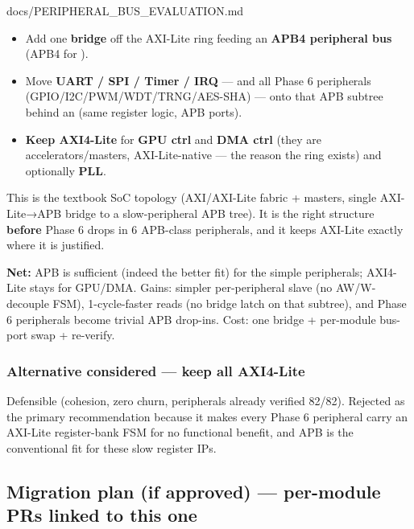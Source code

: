 \begin{relocated}{docs/PERIPHERAL_BUS_EVALUATION.md}
\begin{itemize}
\tightlist
\item
  Add one \textbf{ bridge} off the AXI-Lite ring
  feeding an \textbf{APB4 peripheral bus} (APB4 for ).
\item
  Move \textbf{UART / SPI / Timer / IRQ} --- and all Phase 6 peripherals
  (GPIO/\allowbreak{}I2C/\allowbreak{}PWM/\allowbreak{}WDT/\allowbreak{}TRNG/\allowbreak{}AES-SHA)
  --- onto that APB subtree behind an  (same
  register logic, APB ports).
\item
  \textbf{Keep AXI4-Lite} for \textbf{GPU ctrl} and \textbf{DMA ctrl}
  (they are accelerators/\allowbreak{}masters, AXI-Lite-native --- the
  reason the ring exists) and optionally \textbf{PLL}.
\end{itemize}

This is the textbook SoC topology (AXI/\allowbreak{}AXI-Lite fabric +
masters, single AXI-Lite→APB bridge to a slow-peripheral APB tree). It
is the right structure \textbf{before} Phase 6 drops in 6 APB-class
peripherals, and it keeps AXI-Lite exactly where it is justified.

\textbf{Net:} APB is sufficient (indeed the better fit) for the simple
peripherals; AXI4-Lite stays for GPU/DMA. Gains: simpler per-peripheral
slave (no AW/\allowbreak{}W-decouple FSM), 1-cycle-faster reads (no
bridge latch on that subtree), and Phase 6 peripherals become trivial
APB drop-ins. Cost: one bridge + per-module bus-port swap + re-verify.

\subsubsection{Alternative considered --- keep all AXI4-Lite}\label{tm:dec:peripheral-bus:alternative-considered-keep-all-axi4-lite}

Defensible (cohesion, zero churn, peripherals already verified
 82/82). Rejected as the primary recommendation because it
makes every Phase 6 peripheral carry an AXI-Lite register-bank FSM for
no functional benefit, and APB is the conventional fit for these slow
register IPs.

\subsection{Migration plan (if approved) --- per-module PRs linked to
this one}\label{tm:dec:peripheral-bus:4-migration-plan-if-approved-per-module-prs-linked-to-this-one}


\end{relocated}
